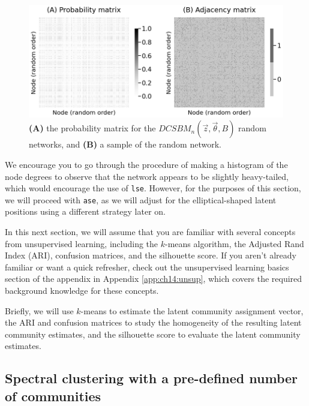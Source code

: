 \begin{figure}[h]
    \centering
    \includegraphics[width=\linewidth]{applications/ch7/Images/comm_detect_ex.png}
    \caption[Community detection three community example]{\textbf{(A)} the probability matrix for the $DCSBM_n(\vec z, \vec \theta, B)$ random networks, and \textbf{(B)} a sample of the random network.}
    \label{fig:ch7:comm_detect:ex}
\end{figure}
We encourage you to go through the procedure of making a histogram of the node degrees to observe that the network appears to be slightly heavy-tailed, which would encourage the use of \texttt{lse}. However, for the purposes of this section, we will proceed with \texttt{ase}, as we will adjust for the elliptical-shaped latent positions using a different strategy later on. 

\begin{floatingbox}[h]\caption{Refamiliarize yourself with unsupervised learning}
In this next section, we will assume that you are familiar with several concepts from unsupervised learning, including the $k$-means algorithm, the Adjusted Rand Index (ARI), confusion matrices, and the silhouette score. If you aren't already familiar or want a quick refresher, check out the unsupervised learning basics section of the appendix in Appendix \ref{app:ch14:unsup}, which covers the required background knowledge for these concepts.

Briefly, we will use $k$-means to estimate the latent community assignment vector, the ARI and confusion matrices to study the homogeneity of the resulting latent community estimates, and the silhouette score to evaluate the latent community estimates.
\end{floatingbox}

\subsection{Spectral clustering with a pre-defined number of communities}
\label{sec:ch7:comm_detect:known}

